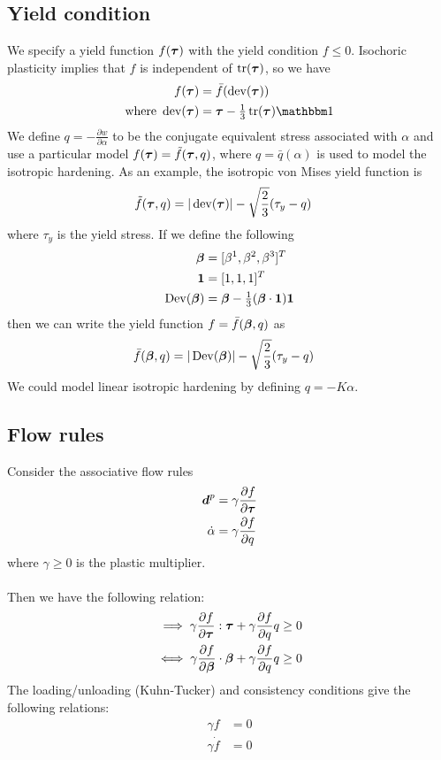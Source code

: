 \documentclass[10pt]{article}
\begin{document}
\subsection{Yield condition}

We specify a yield function $f(\mbox{\boldmath$\tau$})$ with the yield condition $f \leq 0$. Isochoric plasticity implies that $f$ is independent of $\text{tr}(\mbox{\boldmath$\tau$})$, so we have
\begin{align}
f(\Btau) &= \bar{f}(\dev(\Btau))\\
\text{where } \dev(\Btau) &= \Btau - \third \tr(\Btau) \iso
\end{align}
We define $q = -\frac{\partial w}{\partial \alpha}$ to be the conjugate equivalent stress associated with $\alpha$ and use a particular model $f(\mbox{\boldmath$\tau$}) = \tilde{f}(\mbox{\boldmath$\tau$},q)$, where $q = \bar{q}(\alpha)$ is used to model the isotropic hardening. As an example, the isotropic von Mises yield function is
\begin{align}
\tilde{f}(\mbox{\boldmath$\tau$},q) &= |\mathop{\rm dev}\nolimits(\mbox{\boldmath$\tau$})| - \sqrt{\frac{2}{3}}(\tau_y - q)
\end{align}
where $\tau_y$ is the yield stress. If we define the following
\begin{align}
\mbox{\boldmath$\beta$} &= [\beta^1,\beta^2,\beta^3]^T\\
\mbox{\boldmath$1$} &= [1,1,1]^T\\
\mathop{\rm Dev}\nolimits(\mbox{\boldmath$\beta$}) &= \mbox{\boldmath$\beta$} - {\textstyle{1 \over 3}} (\mbox{\boldmath$\beta$} \cdot \mbox{\boldmath$1$}) \mbox{\boldmath$1$}
\end{align}
then we can write the yield function $f = \bar{f}(\mbox{\boldmath$\beta$},q)$ as
\begin{align}
\bar{f}(\mbox{\boldmath$\beta$},q) &= |\mathop{\rm Dev}\nolimits(\mbox{\boldmath$\beta$})| - \sqrt{\frac{2}{3}}(\tau_y - q)
\end{align}
We could model linear isotropic hardening by defining $q = -K\alpha$.

\subsection{Flow rules}

Consider the associative flow rules
\begin{align}
\mbox{\boldmath$ d$}^p &= \gamma \frac{\partial f}{\partial \mbox{\boldmath$\tau$}}\\
\dot{\alpha} &= \gamma \frac{\partial f}{\partial q}
\end{align}
where $\gamma \geq 0$ is the plastic multiplier.\\
\\
Then we have the following relation:
\begin{align}
\implies \gamma \frac{\partial f}{\partial \mbox{\boldmath$\tau$}}:\mbox{\boldmath$\tau$}
+ \gamma \frac{\partial f}{\partial q} q \geq 0\\
\iff \gamma \frac{\partial f}{\partial \mbox{\boldmath$\beta$}}\cdot\mbox{\boldmath$\beta$}
+ \gamma \frac{\partial f}{\partial q} q \geq 0
\end{align}
The loading/unloading (Kuhn-Tucker) and consistency conditions give the following relations:
\begin{align}
\gamma f &= 0\\
\gamma \dot{f} &= 0
\end{align}
\end{document}
